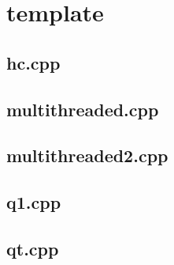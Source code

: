 \section{template}

\subsection{hc.cpp}


\subsection{multithreaded.cpp}


\subsection{multithreaded2.cpp}


\subsection{q1.cpp}


\subsection{qt.cpp}


